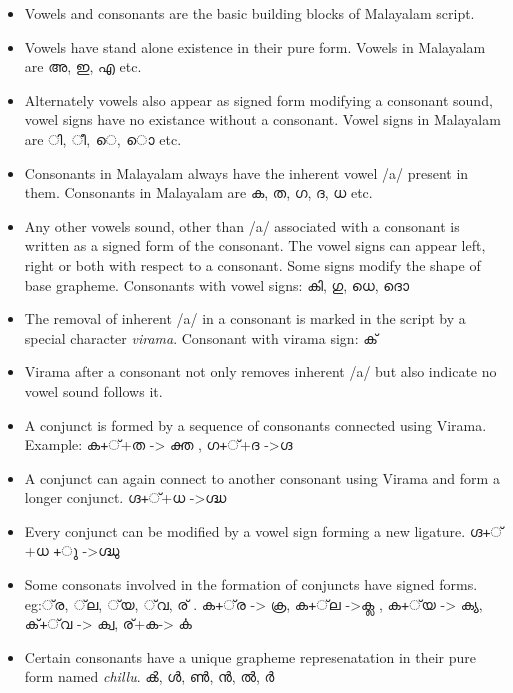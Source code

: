 \documentclass[10pt]{article}
\begin{document}
\begin{itemize}
	\item
	Vowels and consonants are the basic building blocks of Malayalam script.
	\item
	Vowels have stand alone existence in their pure form. Vowels in Malayalam are {\manjari അ, ഇ, എ }etc.
	\item
	Alternately vowels also appear as signed form modifying a consonant sound, vowel signs have no existance without a consonant. Vowel signs in Malayalam are {\manjari  ി, ീ, െ, ൊ }etc.
	\item Consonants in Malayalam always have the inherent vowel /a/ present in them. Consonants in Malayalam are {\manjari ക, ത, ഗ, ദ, ധ }etc.
	\item
	Any other vowels sound, other than /a/  associated with a consonant is written as a signed form of the consonant. The vowel signs can  appear left, right or both with respect to a consonant. Some signs modify the shape of base grapheme. Consonants with vowel signs:  {\manjari കി, ഗു, ധെ, ദൊ} 
	\item 
	The removal of inherent /a/ in a consonant is marked in the script by a special character \textit{virama}. Consonant with virama sign: {\manjari ക് }
	\item
	Virama after a consonant not only removes inherent /a/ but also indicate no vowel sound follows it. 
	\item
	A conjunct is formed by  a sequence of consonants connected using Virama. Example: {\manjari ക+്+ത -> ക്ത , ഗ+്+ദ ->ഗ്ദ }
	\item
	A conjunct can again connect to another consonant using Virama and form a longer conjunct. {\manjari ഗ്ദ+്+ധ ->ഗ്ദ്ധ }
	\item	
	Every conjunct can be modified by a vowel sign forming a new ligature. 
	{\manjari ഗ്ദ+്+ധ +ു ->ഗ്ദ്ധു }
	\item
	Some consonats involved in the formation of conjuncts have signed forms. eg:{\manjari ്‌ര, ്‌ല, ്‌യ, ്‌വ, ര് . ക+്‌ര -> ക്ര, ക+്‌ല ->ക്ല , ക+്‌യ -> ക്യ, ക്+്‌വ -> ക്വ, ര്+ക-> ൎക}
	\item 
	Certain consonants have a unique grapheme represenatation in their pure form named \textit{chillu}. {\manjari ൿ, ൾ, ൺ, ൻ, ൽ, ർ }
\end{itemize}
\end{document}
